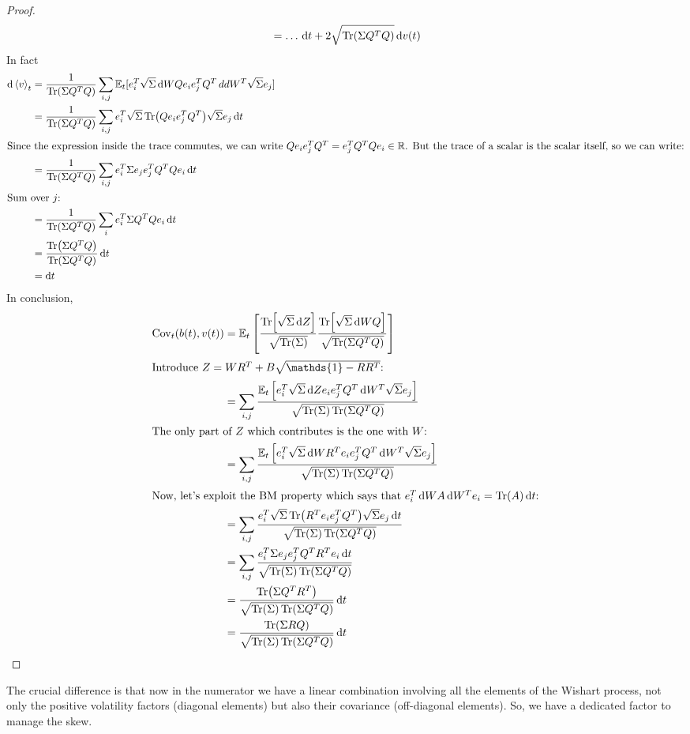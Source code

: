 \begin{proof}
\begin{align*}
        &=
        \dots\,\dd t + 2\sqrt{\Tr(\Sigma Q^TQ)}\,\dd v(t) \\
    \end{align*}
    In fact
    \begin{align*}
        \dd\expval{v}_t &= \frac{1}{\Tr(\Sigma Q^TQ)}\sum_{i,j}\mathbb{E}_t[e^T_i\sqrt{\Sigma}\,\dd WQ e_i e^T_j Q^T\,dd W^T \sqrt{\Sigma} e_j] \\
        &=
        \frac{1}{\Tr(\Sigma Q^TQ)}\sum_{i,j}e^T_i\sqrt{\Sigma}\Tr(Qe_ie_j^TQ^T)\sqrt{\Sigma}e_j\,\dd t \\
        \intertext{Since the expression inside the trace commutes, we can write $Qe_ie_j^TQ^T = e^T_jQ^TQe_i\in\mathbb{R}$. But the trace of a scalar is the scalar itself, so we can write:}
        &=
        \frac{1}{\Tr(\Sigma Q^TQ)}\sum_{i,j}e^T_i\Sigma e_j e_j^TQ^TQe_i\,\dd t \\
        \intertext{Sum over $j$:}
        &=
        \frac{1}{\Tr(\Sigma Q^TQ)} \sum_{i} e^T_i\Sigma Q^TQe_i\,\dd t \\
        &=
        \frac{\Tr(\Sigma Q^TQ)}{\Tr(\Sigma Q^TQ)}\,\dd t \\
        &=
        \dd t
    \end{align*}
    In conclusion,
    \begin{align*}
        \Cov_t(b(t),v(t)) &= \mathbb{E}_t\left[\frac{\Tr[\sqrt{\Sigma}\,\dd Z]}{\sqrt{\Tr(\Sigma)}} \frac{\Tr[\sqrt{\Sigma}\,\dd WQ]}{\sqrt{\Tr(\Sigma Q^TQ)}}\right] \\
        \intertext{Introduce $Z = WR^T + B\sqrt{\mathds{1}-RR^T}$:}
        &=
        \sum_{i,j}\frac{\mathbb{E}_t\left[e^T_i\sqrt{\Sigma}\,\dd Z e_i e^T_j Q^T\,\dd W^T\sqrt{\Sigma}e_j\right]}{\sqrt{\Tr(\Sigma)\Tr(\Sigma Q^TQ)}} \\
        \intertext{The only part of $Z$ which contributes is the one with $W$:}
        &=
        \sum_{i,j}\frac{\mathbb{E}_t\left[e^T_i\sqrt{\Sigma}\,\dd WR^T e_i e^T_j Q^T\,\dd W^T\sqrt{\Sigma}e_j\right]}{\sqrt{\Tr(\Sigma)\Tr(\Sigma Q^TQ)}} \\
        \intertext{Now, let's exploit the BM property which says that $e^T_i\,\dd WA\,\dd W^Te_i = \Tr(A)\,\dd t$:}
        &=
        \sum_{i,j}\frac{e^T_i\sqrt{\Sigma}\Tr(R^Te_ie_j^TQ^T)\sqrt{\Sigma}e_j\,\dd t}{\sqrt{\Tr(\Sigma)\Tr(\Sigma Q^TQ)}} \\
        &=
        \sum_{i,j}\frac{e^T_i\Sigma e_je_j^TQ^TR^Te_i\,\dd t}{\sqrt{\Tr(\Sigma)\Tr(\Sigma Q^TQ)}} \\
        &=
        \frac{\Tr(\Sigma Q^TR^T)}{\sqrt{\Tr(\Sigma)\Tr(\Sigma Q^TQ)}}\,\dd t \\
        &=
        \frac{\Tr(\Sigma RQ)}{\sqrt{\Tr(\Sigma)\Tr(\Sigma Q^TQ)}}\,\dd t
    \end{align*}
\end{proof}
The crucial difference is that now in the numerator we have a linear combination involving all the elements of the Wishart process, not only the positive volatility factors (diagonal elements) but also their covariance (off-diagonal elements). So, we have a dedicated factor to manage the skew.

